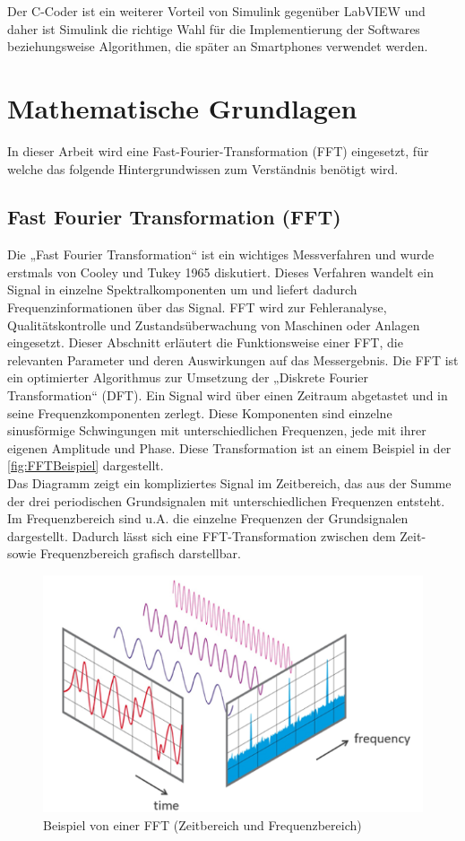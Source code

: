 Der C-Coder ist ein weiterer Vorteil von Simulink gegenüber LabVIEW und daher ist Simulink die richtige Wahl für die Implementierung der Softwares beziehungsweise Algorithmen, die später an Smartphones verwendet werden.






\section{Mathematische Grundlagen}

In dieser Arbeit wird eine Fast-Fourier-Transformation (FFT) eingesetzt, für welche das folgende Hintergrundwissen zum Verständnis benötigt wird.
\subsection{Fast Fourier Transformation (FFT)} \label{abs:FFT}

Die „Fast Fourier Transformation“ ist ein wichtiges Messverfahren und wurde erstmals von Cooley und Tukey 1965 diskutiert. Dieses Verfahren wandelt ein Signal in einzelne Spektralkomponenten um und liefert dadurch Frequenzinformationen über das Signal. FFT wird zur Fehleranalyse, Qualitätskontrolle und Zustandsüberwachung von Maschinen oder Anlagen eingesetzt. Dieser Abschnitt erläutert die Funktionsweise einer FFT, die relevanten Parameter und deren Auswirkungen auf das Messergebnis.
Die FFT ist ein optimierter Algorithmus zur Umsetzung der „Diskrete Fourier Transformation“ (DFT). Ein Signal wird über einen Zeitraum abgetastet und in seine Frequenzkomponenten zerlegt. Diese Komponenten sind einzelne sinusförmige Schwingungen mit unterschiedlichen Frequenzen, jede mit ihrer eigenen Amplitude und Phase. Diese Transformation ist an einem Beispiel in der \autoref{fig:FFTBeispiel} dargestellt.\\
Das Diagramm zeigt ein kompliziertes Signal im Zeitbereich, das aus der Summe der drei periodischen Grundsignalen mit unterschiedlichen Frequenzen entsteht. Im Frequenzbereich sind u.A. die einzelne Frequenzen der Grundsignalen dargestellt. Dadurch lässt sich eine FFT-Transformation zwischen dem Zeit- sowie Frequenzbereich grafisch darstellbar.

\begin{figure}
	\centering
	\includegraphics[width=0.5\linewidth]{Bilder/FFTBeispiel.png}
	\caption{Beispiel von einer FFT (Zeitbereich und Frequenzbereich)\citep{NTIAudioFFT}}
	\label{fig:FFTBeispiel}
\end{figure}

